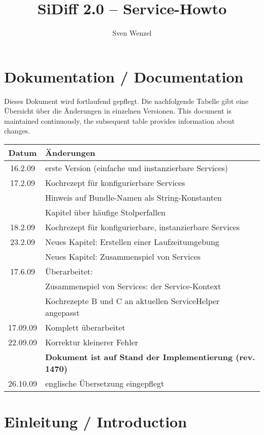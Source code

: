 \documentclass[10pt,a4paper]{scrartcl}
\title{SiDiff 2.0 -- Service-Howto}
\author{Sven Wenzel}
\providecommand{\deng}[2]{#1 / {\sffamily #2}}
\providecommand{\deutsch}[1]{#1}
\providecommand{\englisch}[1]{{\sffamily #1}}
\begin{document}
\maketitle
\tableofcontents
\newpage
\section*{\deng{Dokumentation}{Documentation}}
\deutsch{Dieses Dokument wird fortlaufend gepflegt. Die nachfolgende Tabelle
gibt eine Übersicht über die Änderungen in einzelnen Versionen.}
\englisch{This document is maintained continuously, the subsequent table 
provides information about changes.}



\begin{tabular}{|c|p{11cm}|}\hline
Datum & Änderungen \\\hline\hline
16.2.09 & erste Version (einfache und instanzierbare Services) \\\hline
17.2.09 & Kochrezept für konfigurierbare Services \\
& Hinweis auf Bundle-Namen als String-Konstanten \\
& Kapitel über häufige Stolperfallen \\\hline
18.2.09 & Kochrezept für konfigurierbare, instanzierbare Services \\\hline
23.2.09 & Neues Kapitel: Erstellen einer Laufzeitumgebung \\
& Neues Kapitel: Zusammenspiel von Services \\\hline
17.6.09 & Überarbeitet: \\
& Zusammenspiel von Services: der Service-Kontext \\
& Kochrezepte B und C an aktuellen ServiceHelper angepasst \\\hline
17.09.09 & Komplett überarbeitet \\\hline
22.09.09 & Korrektur kleinerer Fehler\\
& \textbf{Dokument ist auf Stand der Implementierung (rev. 1470)}\\\hline
26.10.09 & englische Übersetzung eingepflegt\\\hline
\end{tabular} 


\newpage
\section{\deng{Einleitung}{Introduction}}
\end{document}
